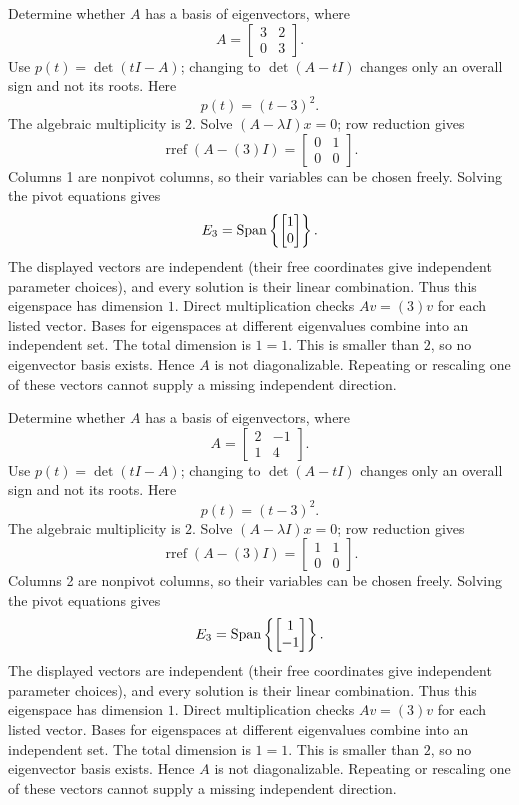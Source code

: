 \goal Determine whether $A$ has a basis of eigenvectors, where
\[A=\begin{bmatrix}3&2\\0&3\end{bmatrix}.\]
Use $p(t)=\det(tI-A)$; changing to $\det(A-tI)$ changes only an overall sign and not its roots. Here
\[p(t)=\left(t - 3\right)^{2}.\]
The algebraic multiplicity is $2$. Solve $(A-\lambda I)x=0$; row reduction gives
\[\operatorname{rref}(A-(3)I)=\begin{bmatrix}0&1\\0&0\end{bmatrix}.\]
Columns 1 are nonpivot columns, so their variables can be chosen freely. Solving the pivot equations gives
\[E_{3}=\operatorname{Span}\left\{\begin{bmatrix}1\\0\end{bmatrix}\right\}.\]
The displayed vectors are independent (their free coordinates give independent parameter choices), and every solution is their linear combination. Thus this eigenspace has dimension $1$. Direct multiplication checks $Av=(3)v$ for each listed vector.
Bases for eigenspaces at different eigenvalues combine into an independent set. The total dimension is $1=1$.
This is smaller than $2$, so no eigenvector basis exists. Hence $A$ is not diagonalizable. Repeating or rescaling one of these vectors cannot supply a missing independent direction.


\goal Determine whether $A$ has a basis of eigenvectors, where
\[A=\begin{bmatrix}2&-1\\1&4\end{bmatrix}.\]
Use $p(t)=\det(tI-A)$; changing to $\det(A-tI)$ changes only an overall sign and not its roots. Here
\[p(t)=\left(t - 3\right)^{2}.\]
The algebraic multiplicity is $2$. Solve $(A-\lambda I)x=0$; row reduction gives
\[\operatorname{rref}(A-(3)I)=\begin{bmatrix}1&1\\0&0\end{bmatrix}.\]
Columns 2 are nonpivot columns, so their variables can be chosen freely. Solving the pivot equations gives
\[E_{3}=\operatorname{Span}\left\{\begin{bmatrix}1\\-1\end{bmatrix}\right\}.\]
The displayed vectors are independent (their free coordinates give independent parameter choices), and every solution is their linear combination. Thus this eigenspace has dimension $1$. Direct multiplication checks $Av=(3)v$ for each listed vector.
Bases for eigenspaces at different eigenvalues combine into an independent set. The total dimension is $1=1$.
This is smaller than $2$, so no eigenvector basis exists. Hence $A$ is not diagonalizable. Repeating or rescaling one of these vectors cannot supply a missing independent direction.



